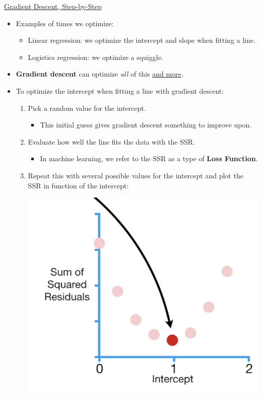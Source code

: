\documentclass[12pt, titlepage, french]{report}
\begin{document}
\begin{YTB_SUMM_AUTO_NUMB}[label = {SQ-desc-grad}]{\href{https://www.youtube.com/watch?v=sDv4f4s2SB8}{Gradient Descent, Step-by-Step}}
\begin{itemize}[leftmargin = *]
	\item	Examples of times we optimize:
		\begin{itemize}[leftmargin = *]
		\item	Linear regression: we optimize the intercept and slope when fitting a line.
		\item	Logistics regression: we optimize a squiggle.
		\end{itemize}
	\item	\textbf{Gradient descent} can optimize \textit{all} of this \underline{and more}.
	\item	To optimize the intercept when fitting a line with gradient descent:
		\begin{enumerate}[leftmargin = *]
		\item	Pick a random value for the intercept.
			\begin{itemize}[leftmargin = *]
			\item	This initial guess gives gradient descent something to improve upon.	
			\end{itemize}
		\item	Evaluate how well the line fits the data with the SSR.
			\begin{itemize}[leftmargin = *]
			\item	In machine learning, we refer to the SSR as a type of \textbf{Loss Function}.
			\end{itemize}
		\item	Repeat this with several possible values for the intercept and plot the SSR in function of the intercept:
			\begin{center}
			\includegraphics[scale=0.4]{src/SQ-GD-SSR.png}

\end{center}
\end{enumerate}
\end{itemize}
\end{YTB_SUMM_AUTO_NUMB}
\end{document}
